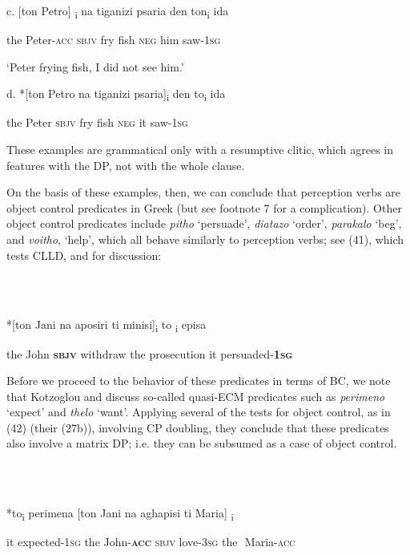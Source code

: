 \documentclass[output=paper]{langsci/langscibook}
\begin{document}
  c.  [ton Petro]\textsubscript{ i}    na    tiganizi psaria  den   ton\textsubscript{i}  ida

    the Peter\textsc{{}-acc}  \textsc{sbjv} fry        fish     \textsc{neg}  him  saw{}-\textsc{1sg}

    ‘Peter frying fish, I did not see him.’

  d.  *[ton Petro  na    tiganizi psaria]\textsubscript{i} den  to\textsubscript{i}  ida

      the  Peter  \textsc{sbjv} fry         fish     \textsc{neg}  it  saw{}-\textsc{1sg}

These examples are grammatical only with a resumptive clitic, which agrees in features with the DP, not with the whole clause.{} 

  On the basis of these examples, then, we can conclude that perception verbs are object control predicates in Greek (but see footnote 7 for a complication). Other object control predicates include \textit{pitho} ‘persuade’, \textit{diatazo} ‘order’, \textit{parakalo} ‘beg’, and \textit{voitho}, ‘help’, which all behave similarly to perception verbs; see (41), which tests CLLD, and \citet{Kotzoglou2002} for discussion:

\ea%
    \label{ex:key:41}
    \gll\\
        \\
    \glt
    \z

          *[ton Jani  na    aposiri      ti    minisi]\textsubscript{i}        to\textsubscript{ i}  episa

    the John  \textbf{\textsc{sbjv}} withdraw  the prosecution it  persuaded{}-\textbf{\textsc{1sg}}

Before we proceed to the behavior of these predicates in terms of BC, we note that Kotzoglou and \citet{Papangeli2007} discuss so-called quasi-ECM predicates such as \textit{perimeno} ‘expect’ and \textit{thelo} ‘want’. Applying several of the tests for object control, as in (42) (their (27b)), involving CP doubling, they conclude that these predicates also involve a matrix DP; i.e. they can be subsumed as a case of object control. 

\ea%
    \label{ex:key:42}
    \gll\\
        \\
    \glt
    \z

          *to\textsubscript{i} perimena\textsubscript{} [ton  Jani          na    aghapisi  ti       Maria]\textsubscript{ i}

    it expected{}-\textsc{1sg}    the  John\textsc{{}-}\textbf{\textsc{acc}} \textsc{sbjv} love{}-\textsc{3sg}    the  Maria\textsc{{}-acc}
\end{document}
